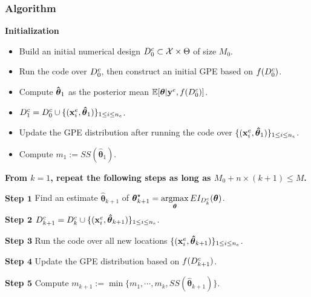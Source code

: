 \documentclass[nopagenumber,9pt]{beamer}
\newcommand{\mb}[1]{\mathbf{#1}}
\newcommand{\argmax}[2]{%
\smash{\mathop{{\rm argmax}}\limits_{#1}}\,#2}
\newcommand{\ms}[1]{\boldsymbol{#1}}
\begin{document}
\begin{frame}
 \frametitle{Algorithm}




\textbf{Initialization}

\begin{itemize}
\item Build an initial numerical design $D^c_0\subset\mathcal{X}\times\Theta$ of size $M_0$.

\item Run the code over $D^c_0$, {then construct an initial GPE based on $f(D^c_{0})$}.

\item Compute $\ms{\hat{\btheta}}_1$ as the posterior mean ${\mathbb E}[\boldsymbol{\theta}|\mathbf{y}^{e},f(D^c_0)]$.

\item $\Dc_{1}=\Dc_0\cup\{(\bxexp_i,\ms{\hat{\theta}}_{1})\}_{1\leq i \leq \nexp}$.

\item Update the GPE distribution after running the code over $\{(\bxexp_i,\ms{\hat{\theta}}_{1})\}_{1\leq i \leq \nexp}$.

\item {Compute} $m_1:=SS(\ms{\hat{\theta}}_1)$.
\end{itemize}

\smallskip
\textbf{From $k=1$, repeat the following steps as long as $M_{0}+n\times (k+1)\leq M$.}

 \bigskip
 \textbf{Step $\mb{1}$} 
 Find an estimate $\ms{\hat{\theta}}_{k+1}$ of 
$\btheta_{k+1}^{\star}=\argmax{\btheta}{EI_{\Dc_k}(\btheta)}$.

\bigskip
\textbf{Step $\mb{2}$} $\Dc_{k+1}=\Dc_k\cup\{(\bxexp_i,\ms{\hat{\theta}}_{k+1})\}_{1\leq i \leq \nexp}$.
 

\bigskip
\textbf{Step $\mb{3}$} Run the code over all new locations $\{(\bxexp_i,\ms{\hat{\theta}}_{k+1})\}_{1\leq i \leq \nexp}$.


\bigskip
\textbf{Step $\mb{4}$} Update the GPE distribution based on $f(D^c_{k+1})$.

\bigskip
\textbf{Step $\mb{5}$} {Compute} $m_{k+1}:=\min{\{m_1,\cdots,m_k,SS(\ms{\hat{\theta}}_{k+1})\}}$. 

\end{frame}
\end{document}
